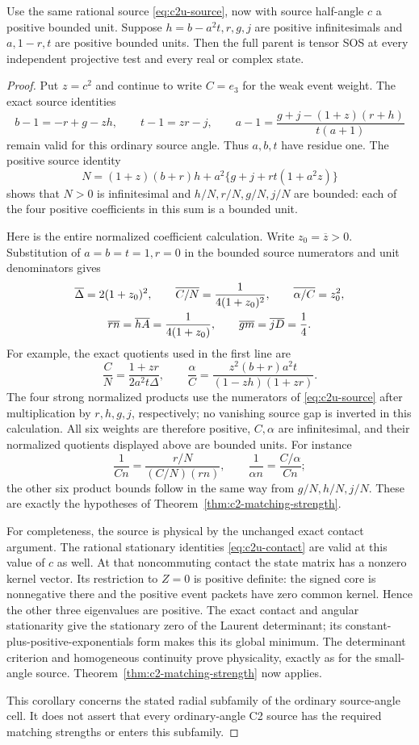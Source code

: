 \begin{corollary}
\label{cor:c2-ordinary-angle-radial}
Use the same rational source \eqref{eq:c2u-source}, now with source
half-angle $c$ a positive bounded unit.  Suppose $h=b-a^2t,r,g,j$ are
positive infinitesimals and $a,1-r,t$ are positive bounded units.
Then the full parent is tensor SOS at every independent projective test
and every real or complex state.
\end{corollary}
\begin{proof}
Put $z=c^2$ and continue to write $C=e_3$ for the weak event weight.
The exact source identities
\[
 b-1=-r+g-zh,\qquad t-1=zr-j,\qquad
 a-1=\frac{g+j-(1+z)(r+h)}{t(a+1)}
\]
remain valid for this ordinary source angle.  Thus $a,b,t$ have residue
one.  The positive source identity
\[
 N=(1+z)(b+r)h+a^2\{g+j+rt(1+a^2z)\}
\]
shows that $N>0$ is infinitesimal and $h/N,r/N,g/N,j/N$ are bounded:
each of the four positive coefficients in this sum is a bounded unit.

Here is the entire normalized coefficient calculation.  Write
$z_0=\overline z>0$.  Substitution of $a=b=t=1,r=0$ in the bounded
source numerators and unit denominators gives
\begin{gather}
 \overline\Delta=2(1+z_0)^2,\qquad
 \overline{C/N}=\frac1{4(1+z_0)^2},\qquad
 \overline{\alpha/C}=z_0^2,\notag\\
 \overline{rn}=\overline{hA}=\frac1{4(1+z_0)},\qquad
 \overline{gm}=\overline{jD}=\frac14.
\label{eq:c2ms-ordinary-residues}
\end{gather}
For example, the exact quotients used in the first line are
\[
 \frac CN=\frac{1+zr}{2a^2t\Delta},\qquad
 \frac\alpha C=\frac{z^2(b+r)a^2t}{(1-zh)(1+zr)}.
\]
The four strong normalized products use the numerators of
\eqref{eq:c2u-source} after multiplication by $r,h,g,j$, respectively;
no vanishing source gap is inverted in this calculation.
All six weights are therefore positive, $C,\alpha$ are infinitesimal,
and their normalized quotients displayed above are bounded units.
For instance
\[
 \frac1{Cn}=\frac{r/N}{(C/N)(rn)},\qquad
 \frac1{\alpha n}=\frac{C/\alpha}{Cn};
\]
the other six product bounds follow in the same way from $g/N,h/N,j/N$.
These are exactly the hypotheses of Theorem~\ref{thm:c2-matching-strength}.

For completeness, the source is physical by the unchanged exact contact
argument.  The rational stationary identities
\eqref{eq:c2u-contact} are valid at this value of $c$ as well.
At that noncommuting contact the state matrix has a nonzero kernel
vector.  Its restriction to $Z=0$ is positive definite: the signed core
is nonnegative there and the positive event packets have zero common
kernel.  Hence the other three eigenvalues are positive.  The exact
contact and angular stationarity give the stationary zero of the
Laurent determinant; its constant-plus-positive-exponentials form makes
this its global minimum.  The determinant criterion and homogeneous
continuity prove physicality, exactly as for the small-angle source.
Theorem~\ref{thm:c2-matching-strength} now applies.

This corollary concerns the stated radial subfamily of the ordinary
source-angle cell.  It does not assert that every ordinary-angle C2
source has the required matching strengths or enters this subfamily.
\end{proof}
